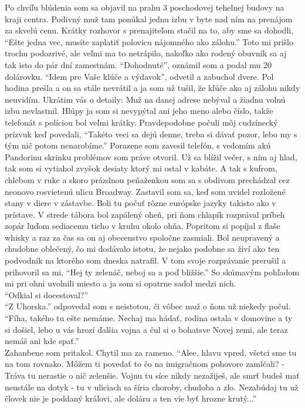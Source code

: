\documentclass[12pt, a4paper]{article}
\begin{document}
Po chvíľu blúdenia som sa objavil na prahu 3 poschodovej tehelnej budovy na kraji centra.
Podivný muž tam ponúkal jednu izbu v byte nad ním na prenájom za skvelú cenu.
Krátky rozhovor s prenajiteľom stačil na to, aby sme sa dohodli, \enquote{Ešte jedna vec, musíte zaplatiť polovicu nájomného ako zálohu.}
Toto mi prišlo trochu podozrivé, ale veľmi ma to netrápilo, nakoľko ako rodený obuvník sa aj tak isto do pár dní zamestnám.
\enquote{Dohodnuté}, oznámil som a podal mu 20 dolárovku.
\enquote{Idem pre Vaše klúče a výdavok}, odvetil a zabuchol dvere.
Pol hodina prešla a on sa stále nevrátil a ja som už tušil, že kľúče ako aj zálohu nikdy neuvidím. Ukrátim vás o detaily: Muž na danej adrese nebýval a žiadnu volnú izbu nevlastnil.
Hlúpy ja som si nevypýtal ani jeho meno alebo číslo, takže telefonát s políciou bol veľmi krátky. Pravdepodobne počuli môj cudzínecký prízvuk keď povedali, \enquote{Takéto veci sa dejú denne, treba si dávať pozor, lebo my s tým nič potom nenarobíme.}
Porazene som zavesil telefón, s vedomím akú Pandorinu skrinku problémov som práve otvoril.
Už sa blížil večer, s ním aj hlad, tak som si vytiahol zvyšok desiaty ktorý mi ostal v kabáte.
A tak s kufrom, chlebom v ruke a skoro prázdnou peňaženkou som sa s obdivom prechádzal cez neonovo rosvietenú ulicu Broadway.
Zastavil som sa, keď som uvidel rozložené stany v diere v zástavbe.
Boli tu počuť rôzne európske jazyky takisto ako v prístave.
V strede tábora bol zapálený oheň, pri ňom chlapík rozprával príbeh zopár ľuďom sediacemu ticho v kruhu okolo ohňa.
Popritom si popíjal z flaše whisky a raz za čas sa on aj obecenstvo spoločne zasmiali.
Bol neupravený a chudobne oblečený, čo mi dodávalo istotu, že nejako podobne sa živí ako ten podvodník na ktorého som dneska natrafil.
V tom svoje rozprávanie prerušil a prihovoril sa mi, \enquote{Hej ty zelenáč, neboj sa a poď bližšie.} So skúmavým pohľadom mi pri ohni uvolnili miesto a ja som si opatrne sadol medzi nich.
\\\enquote{Odkial si docestoval?}
\\\enquote{Z Uhorska.} odpovedal som s neistotou, či vôbec muž o ňom už niekedy počul.
\\\enquote{Fíha, takého tu ešte nemáme.
Nechaj ma hádať, rodina ostala v domovine a ty si došiel, lebo u vás hrozí ďalšia vojna a čul si o bohatsve Novej zemi, ale teraz nemáš ani kde spať.}
\\Zahanbene som pritakol.
Chytil ma za rameno. \enquote{Alee, hlavu vpred, všetci sme tu na tom rovnako. Môžem ti povedať to čo na imigračnom pohovore zamlčali? - Tráva tu nerastie o nič zelenšie. Vojnu tu síce nikdy nezažiješ, ale smrť budeš mať neustále na dotyk - tu v uliciach sa šíria choroby, chudoba a zlo. Nezabúdaj tu už človek nie je poddaný kráľovi, ale doláru a ten vie byť hrozne krutý...}
\end{document}
